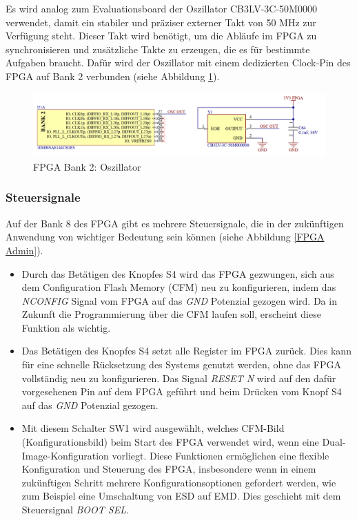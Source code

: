 Es wird analog zum Evaluationsboard der Oszillator CB3LV-3C-50M0000 verwendet, damit ein stabiler und präziser externer Takt von 50 MHz zur Verfügung steht. Dieser Takt wird benötigt, um die Abläufe im FPGA zu synchronisieren und zusätzliche Takte zu erzeugen, die es für bestimmte Aufgaben braucht. Dafür wird der Oszillator mit einem dedizierten Clock-Pin des FPGA auf Bank 2 verbunden (siehe Abbildung \ref{FPGA OSC}).

\begin{figure}[H]
    \centering
    \includegraphics[width=1.0\linewidth]{Figures/Chap3/Schematics/Bank2_OSC.png}
    \caption{FPGA Bank 2: Oszillator}
    \label{FPGA OSC}
\end{figure}

\subsubsection{Steuersignale}
\label{subsec:Steuersignale}

Auf der Bank 8 des FPGA gibt es mehrere Steuersignale, die in der zukünftigen Anwendung von wichtiger Bedeutung sein können (siehe Abbildung \ref{FPGA Admin}).

\begin{itemize}
    \item Durch das Betätigen des Knopfes S4 wird das FPGA gezwungen, sich aus dem Configuration Flash Memory (CFM) neu zu konfigurieren, indem das \textit{NCONFIG} Signal vom FPGA auf das \textit{GND} Potenzial gezogen wird. Da in Zukunft die Programmierung über die CFM laufen soll, erscheint diese Funktion als wichtig.
    
    \item Das Betätigen des Knopfes S4 setzt alle Register im FPGA zurück. Dies kann für eine schnelle Rücksetzung des Systems genutzt werden, ohne das FPGA vollständig neu zu konfigurieren. Das Signal \textit{RESET N} wird auf den dafür vorgesehenen Pin auf dem FPGA geführt und beim Drücken vom Knopf S4 auf das \textit{GND} Potenzial gezogen.
    
    \item Mit diesem Schalter SW1 wird ausgewählt, welches CFM-Bild (Konfigurationsbild) beim Start des FPGA verwendet wird, wenn eine Dual-Image-Konfiguration vorliegt. Diese Funktionen ermöglichen eine flexible Konfiguration und Steuerung des FPGA, insbesondere wenn in einem zukünftigen Schritt mehrere Konfigurationsoptionen gefordert werden, wie zum Beispiel eine Umschaltung von ESD auf EMD. Dies geschieht mit dem Steuersignal \textit{BOOT SEL}.
\end{itemize}

